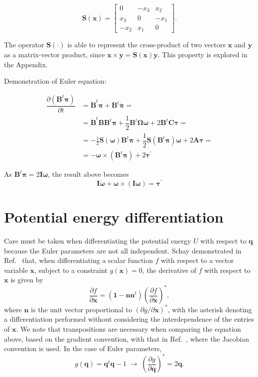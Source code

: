 \documentclass[aip,jcp,reprint,amsmath,amssymb,raggedbottom]{revtex4-1}
\newcommand{\mt}[1]{\boldsymbol{\mathbf{#1}}}           %
\newcommand{\vt}[1]{\boldsymbol{\mathbf{#1}}}           %
\newcommand{\tr}[1]{#1^t}                               %
\newcommand{\diff}[2]{\dfrac{\partial #1}{\partial #2}} %
\begin{document}
\begin{equation}
\label{eq:operator_S}
\mt S(\vt x) = \left[ \begin{array}{ccc}
0   & -x_3 &  x_2 \\
x_3 &  0   & -x_1 \\
-x_2 &  x_1 &  0
\end{array}\right].
\end{equation}

The operator  $\mt S(\cdot)$ is able to represent the cross-product of two vectors $\vt x$ and $\vt y$ as a matrix-vector product, since $\vt x \times \vt y = \mt S(\vt x)\vt y$. This property is explored in the Appendix.

Demonstration of Euler equation:

\begin{align*}
\diff{(\tr{\mt B}\vt \pi)}{t} &= \tr{\dot{\mt B}}\vt \pi + \tr{\mt B}\dot{\vt \pi} = \\
&=\tr{\dot{\mt B}}{\mt B}\tr{\mt B}{\vt \pi}  + \dfrac{1}{2} \tr{\mt B}\mt \Omega \vt \omega + 2 \tr{\mt B}\mt C \vt \tau = \\
&= -\frac{1}{2}{\mt S}(\vt \omega)\tr{\mt B}{\vt \pi} + \dfrac{1}{2} {\mt S}(\tr{\mt B}\mt \pi) \vt \omega + 2 \mt A \vt \tau = \\
&= - \vt \omega \times (\tr{\mt B}{\vt \pi}) + 2 {\vt \tau}^\prime
\end{align*}

As $\tr{\mt B}\vt \pi = 2 \mt I \vt \omega$, the result above becomes
\[
\mt I \dot{\vt \omega} + \vt \omega \times (\mt I \vt \omega) = {\vt \tau}^\prime
\]

\section{Potential energy differentiation}
\label{sec:Diff_PotEng}

Care must be taken when differentiating the potential energy $U$ with respect to $\vt q$ because the Euler parameters are not all independent. Schay demonstrated in Ref.~\cite{Schay1995} that, when differentiating a scalar function $f$ with respect to a vector variable $\vt x$, subject to a constraint $g(\vt x) = 0$, the derivative of $f$ with respect to $\vt x$ is given by
\[
\diff{f}{\vt x} = (\vt 1 - \vt n \tr{\vt n})\left( \diff{f}{\vt x} \right)^\ast,
\]
where $\vt n$ is the unit vector proportional to $(\partial g/\partial \vt x)^\ast$, with the asterisk denoting a differentiation performed without considering the interdependence of the entries of $\vt x$. We note that transpositions are necessary when comparing the equation above, based on the gradient convention, with that in Ref.~\cite{Schay1995}, where the Jacobian convention is used. In the  case of Euler parameters,
\[
g(\vt q) = \tr{\vt q}\vt q - 1 \; \rightarrow \; \left(\diff{g}{\vt q}\right)^\ast = 2 \vt q.
\]
\end{document}
